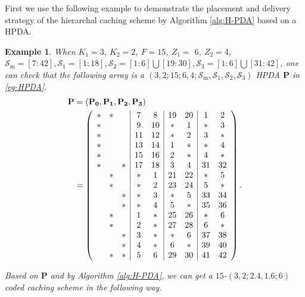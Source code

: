 \documentclass[onecolumn,10pt]{IEEEtran}
\theoremstyle{mythm}
\newtheorem{example}{Example}
\begin{document}
First we use the following example to demonstrate the placement and delivery strategy of the hierarchal caching scheme by Algorithm \ref{alg:H-PDA} based on a HPDA.
\begin{example}
\label{ex-1}
When $K_{1}=3$, $K_{2}=2$, $F=15$, $Z_{1}=$ $6$, $Z_{2}=4$, $\mathcal{S}_\text{m}=[7:42], \mathcal{S}_1=[1:18], \mathcal{S}_2=[1:6]\bigcup[19:30], \mathcal{S}_3=[1:6]\bigcup[31:42]$,  one can check that the following array is a $(3,2;15;6,4;\mathcal{S}_\text{m},\mathcal{S}_1,\mathcal{S}_2,\mathcal{S}_3)$ HPDA $\mathbf{P}$ in \eqref{eg-HPDA}.
\begin{eqnarray}
\label{eg-HPDA}
\begin{split}
\mathbf{P}&=(\mathbf{P_0}, \mathbf{P_1}, \mathbf{P_2}, \mathbf{P_3})\\
&=
\left(
\begin{array}{ccc|cc|cc|cc}
  * & * &   & 7  & 8  & 19 & 20 & 1  & 2 \cr
  * &   &   & 9  & 10 & *  & 1  & *  & 3 \cr
  * &   &   & 11 & 12 & *  & 2  & 3  & * \cr
  * &   &   & 13 & 14 & 1  & *  & *  & 4 \cr
  * &   &   & 15 & 16 & 2  & *  & 4  & * \cr
  * &   & * & 17 & 18 & 3  & 4  & 31 & 32\cr
    & * &   & *  & 1  & 21 & 22 & *  & 5 \cr
    & * &   & *  & 2  & 23 & 24 & 5  & * \cr
    &   & * & *  & 3  & *  & 5  & 33 & 34\cr
    &   & * & *  & 4  & 5  & *  & 35 & 36\cr
    & * &   & 1  & *  & 25 & 26 & *  & 6 \cr
    & * &   & 2  & *  & 27 & 28 & 6  & * \cr
    &   & * & 3  & *  & *  & 6  & 37 & 38\cr
    &   & * & 4  & *  & 6  & *  & 39 & 40\cr
    & * & * & 5  & 6  & 29 & 30 & 41 & 42
\end{array}
\right).
\end{split}
\end{eqnarray}



Based on $\mathbf{P}$ and by Algorithm \ref{alg:H-PDA}, we can get a $15$-$(3,2;2.4,1.6;6)$ coded caching scheme in the following way.


\end{example}
\end{document}

